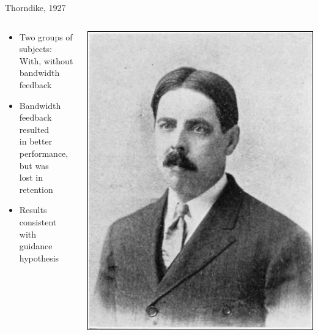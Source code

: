 \documentclass[10pt]{beamer}
\begin{document}

\begin{frame}[fragile]{Thorndike, 1927~\cite{thorndike1927law}}
  \begin{columns}[T]
    \begin{column}{.6\textwidth}
      \begin{itemize}
        \setlength\itemsep{1em}
        \item Two groups of subjects:\\ \quad With, without bandwidth feedback
        \item Bandwidth feedback resulted\\ in better performance, but was\\ lost in retention
        \item Results consistent with\\ guidance hypothesis
      \end{itemize}
    \end{column}
    \begin{column}{.4\textwidth}
      \includegraphics[width=\textwidth]{../img/thorndike.png}

\end{column}
\end{columns}
\end{frame}
\end{document}
